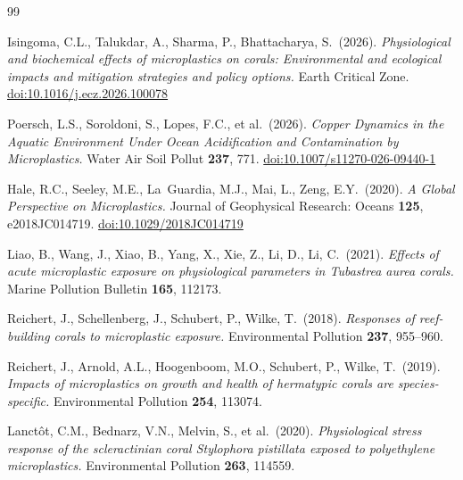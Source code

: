 ﻿\documentclass[12pt,a4paper]{article}
\theoremstyle{definition}
\theoremstyle{remark}
\begin{document}
\begin{thebibliography}{99}

Isingoma, C.L., Talukdar, A., Sharma, P., Bhattacharya, S.\ (2026).
\textit{Physiological and biochemical effects of microplastics on corals:
Environmental and ecological impacts and mitigation strategies and policy options.}
Earth Critical Zone. \href{https://doi.org/10.1016/j.ecz.2026.100078}{doi:10.1016/j.ecz.2026.100078}

Poersch, L.S., Soroldoni, S., Lopes, F.C., et al.\ (2026).
\textit{Copper Dynamics in the Aquatic Environment Under Ocean Acidification
and Contamination by Microplastics.}
Water Air Soil Pollut \textbf{237}, 771.
\href{https://doi.org/10.1007/s11270-026-09440-1}{doi:10.1007/s11270-026-09440-1}

Hale, R.C., Seeley, M.E., La~Guardia, M.J., Mai, L., Zeng, E.Y.\ (2020).
\textit{A Global Perspective on Microplastics.}
Journal of Geophysical Research: Oceans \textbf{125}, e2018JC014719.
\href{https://doi.org/10.1029/2018JC014719}{doi:10.1029/2018JC014719}

Liao, B., Wang, J., Xiao, B., Yang, X., Xie, Z., Li, D., Li, C.\ (2021).
\textit{Effects of acute microplastic exposure on physiological parameters in
Tubastrea aurea corals.}
Marine Pollution Bulletin \textbf{165}, 112173.

Reichert, J., Schellenberg, J., Schubert, P., Wilke, T.\ (2018).
\textit{Responses of reef-building corals to microplastic exposure.}
Environmental Pollution \textbf{237}, 955--960.

Reichert, J., Arnold, A.L., Hoogenboom, M.O., Schubert, P., Wilke, T.\ (2019).
\textit{Impacts of microplastics on growth and health of hermatypic corals
are species-specific.}
Environmental Pollution \textbf{254}, 113074.

Lanct\^{o}t, C.M., Bednarz, V.N., Melvin, S., et al.\ (2020).
\textit{Physiological stress response of the scleractinian coral Stylophora
pistillata exposed to polyethylene microplastics.}
Environmental Pollution \textbf{263}, 114559.


\end{thebibliography}
\end{document}
